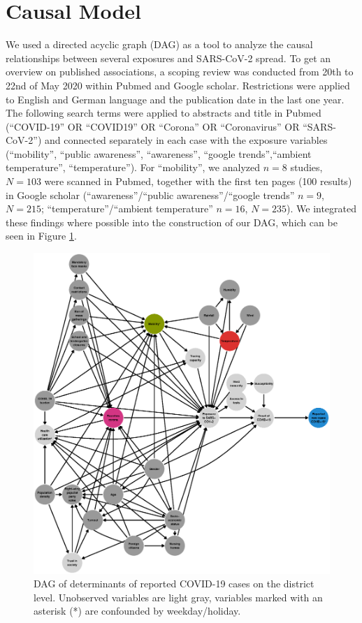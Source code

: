 \documentclass[]{elsarticle} %
\makeatletter
\def\maxwidth{\ifdim\Gin@nat@width>\linewidth\linewidth
\else\Gin@nat@width\fi}
\let\Oldincludegraphics\includegraphics
\renewcommand{\includegraphics}[1]{\Oldincludegraphics[width=\maxwidth]{#1}}
\makeatother
\begin{document}
\hypertarget{causal-model}{%
\section{Causal Model}\label{causal-model}}

We used a directed acyclic graph (DAG) \citep{schipf_directed_2011, textor_robust_2017} as a tool to analyze the causal relationships between several exposures and SARS-CoV-2 spread. To get an overview on published associations, a scoping review was conducted from 20th to 22nd of May 2020 within Pubmed and Google scholar. Restrictions were applied to English and German language and the publication date in the last one year. The following search terms were applied to abstracts and title in Pubmed (``COVID-19'' OR ``COVID19'' OR ``Corona'' OR ``Coronavirus'' OR ``SARS-CoV-2'') and connected separately in each case with the exposure variables (``mobility'', ``public awareness'', ``awareness'', ``google trends'',``ambient temperature'', ``temperature''). For ``mobility'', we analyzed \(n=8\) studies, \(N=103\) were scanned in Pubmed, together with the first ten pages (100 results) in Google scholar (``awareness''/``public awareness''/``google trends'' \(n=9\), \(N=215\); ``temperature''/``ambient temperature'' \(n=16\), \(N=235\)). We integrated these findings where possible into the construction of our DAG, which can be seen in Figure \ref{fig:dag-covid-19}.

\begin{figure}
\centering
\includegraphics{figures/f_full_covid19_dag.eps}
\caption{\label{fig:dag-covid-19}DAG of determinants of reported COVID-19 cases on the district level. Unobserved variables are light gray, variables marked with an asterisk (*) are confounded by weekday/holiday.}
\end{figure}
\end{document}
